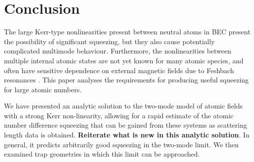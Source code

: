 \documentclass{iopart}
\begin{document}



\section{Conclusion}
\label{sectionConclusion}

The large Kerr-type nonlinearities present between neutral atoms in BEC present the possibility of significant squeezing, but they also cause potentially complicated multimode behaviour.  Furthermore, the nonlinearities between multiple internal atomic states are not yet known for many atomic species, and often have sensitive dependence on external magnetic fields due to Feshbach resonances \cite{FeshbachOrReview}.  This paper analyses the requirements for producing useful squeezing for large atomic numbers.  

We have presented an analytic solution to the two-mode model of atomic fields with a strong Kerr non-linearity, allowing for a rapid estimate of the atomic number difference squeezing that can be gained from these systems as scattering length data is obtained.  \textbf{Reiterate what is new in this analytic solution}.  In general, it predicts arbitrarily good squeezing in the two-mode limit. We then examined trap geometries in which this limit can be approached.
\end{document}
